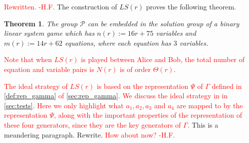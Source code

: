 \documentclass[11pt,letterpaper]{article}
\newcommand{\1}{\mathbb{1}}
\newcommand{\Pg}{\mathcal{P}}
\newcommand{\LS}{LS}
\newcommand{\nr}{n(r)}
\newcommand{\mr}{m(r)}
\def\carl#1{{\color{blue} #1}}
\newcommand{\hf}[1]{\textcolor{red}{#1}}
\newcommand{\hfc}[1]{\textcolor{red}{#1 -H.F.}}
\newtheorem{theorem}{Theorem}[section]
\theoremstyle{definition}
\begin{document}
\hfc{Rewritten.}
The construction of $\LS(r)$ proves the following theorem.
\begin{theorem}
	The group $\Pg$ can be embedded in the solution group of a binary linear system game which has
	$\nr := 16r+75$ variables and $\mr := 14r + 62$ equations, where each equation has $3$ variables.
\end{theorem}
\hf{Note that when $\LS(r)$ is played between Alice and Bob, the total
number of equation and variable pairs is $N(r)$ is of order $\Theta(r)$.}

\hf{The ideal strategy of $\LS(r)$ is based on
the representation $\Psi$ of $\Gamma$ defined in \cref{def:rep_gamma}
of \cref{sec:rep_gamma}.
We discuss the ideal strategy in in \cref{sec:tests}.
Here we only highlight what $a_1, a_2, a_3$ and $a_4$ are mapped to by the representation $\Psi$, along
with the important properties of the representation of these four generators,
since they are the key generators of $\Gamma$.
}
\carl{This is a meandering paragraph.  Rewrite.}
\hfc{How about now?}
\end{document}
